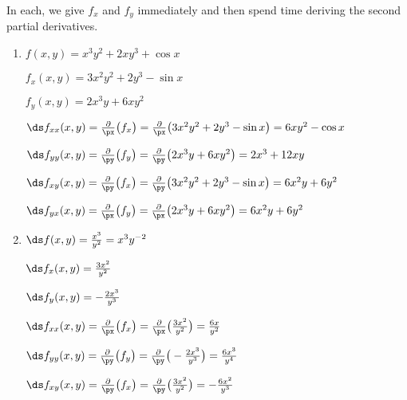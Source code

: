 

{In each, we give $f_x$ and $f_y$ immediately and then spend time deriving the second partial derivatives.
\begin{enumerate}
	\item $f(x,y) = x^3y^2+2xy^3+\cos x$
		
		$f_x(x,y) = 3x^2y^2+2y^3-\sin x$
		
		$f_y(x,y) = 2x^3y+6xy^2$
		
		$\ds f_{xx}(x,y) = \frac{\partial}{\px}\big(f_x\big) = \frac{\partial}{\px}\big(3x^2y^2+2y^3-\sin x\big) = 6xy^2-\cos x$
		
		$\ds f_{yy}(x,y) = \frac{\partial}{\py}\big(f_y\big) = \frac{\partial}{\py}\big(2x^3y+6xy^2\big) = 2x^3+12xy$
		
		$\ds f_{xy}(x,y) = \frac{\partial}{\py}\big(f_x\big) = \frac{\partial}{\py}\big(3x^2y^2+2y^3-\sin x\big) = 6x^2y+6y^2$
		
		$\ds f_{yx}(x,y) = \frac{\partial}{\px}\big(f_y\big) = \frac{\partial}{\px}\big(2x^3y+6xy^2\big) = 6x^2y+6y^2$

\enlargethispage{2\baselineskip}		
	\item		$\ds f(x,y) = \frac{x^3}{y^2} = x^3y^{-2}$
	
	$\ds f_x(x,y) = \frac{3x^2}{y^2}$
	
	$\ds f_y(x,y) = -\frac{2x^3}{y^3}$
	
	$\ds f_{xx}(x,y) = \frac{\partial}{\px}\big(f_x\big) = \frac{\partial}{\px}\big(\frac{3x^2}{y^2}\big) = \frac{6x}{y^2}$
		
		$\ds f_{yy}(x,y) = \frac{\partial}{\py}\big(f_y\big) = \frac{\partial}{\py}\big(-\frac{2x^3}{y^3}\big) = \frac{6x^3}{y^4}$
		
		$\ds f_{xy}(x,y) = \frac{\partial}{\py}\big(f_x\big) = \frac{\partial}{\py}\big(\frac{3x^2}{y^2}\big) = -\frac{6x^2}{y^3}$
		

\end{enumerate}}
